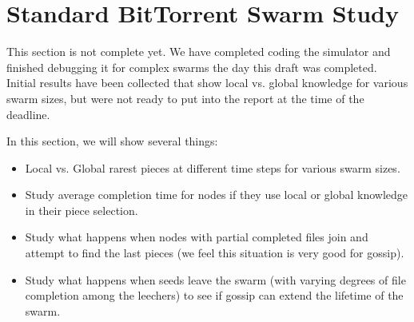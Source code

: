 \section{Standard BitTorrent Swarm Study}

This section is not complete yet. We have completed coding the simulator
and finished debugging it for complex swarms the day this draft was completed. Initial
results have been collected that show local vs. global knowledge for various swarm sizes, but
were not ready to put into the report at the time of the deadline.

In this section, we will show several things:

\begin{itemize}
\item Local vs. Global rarest pieces at different time steps for various swarm sizes.
\item Study average completion time for nodes if they use local or global knowledge in their piece selection.
\item Study what happens when nodes with partial completed files join and attempt to find the last pieces (we feel this situation is very good for gossip).
\item Study what happens when seeds leave the swarm (with varying degrees of file completion among the leechers) to see if gossip can extend the lifetime of the swarm.
\end{itemize}

